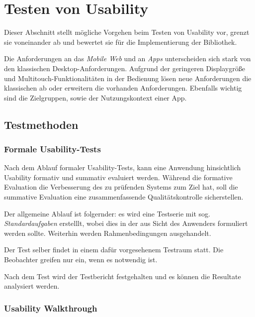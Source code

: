 \section{Testen von Usability}
\label{usability_testing}

Dieser Abschnitt stellt mögliche Vorgehen beim Testen von Usability vor, grenzt sie voneinander ab und bewertet sie für die Implementierung der Bibliothek. 

Die Anforderungen an das \textit{Mobile Web} und an \textit{Apps} unterscheiden sich stark von den klassischen Desktop-Anforderungen. Aufgrund der geringeren Displaygröße und Multitouch-Funktionalitäten in der Bedienung lösen neue Anforderungen die klassischen ab oder erweitern die vorhanden Anforderungen. Ebenfalls wichtig sind die Zielgruppen, sowie der Nutzungskontext einer App. 

\subsection{Testmethoden \label{sec:testmethoden}}

\subsubsection{Formale Usability-Tests \label{sec:formal-usability-test}}

Nach dem Ablauf formaler Usability-Tests, kann eine Anwendung hinsichtlich Usability formativ und summativ evaluiert werden. Während die formative Evaluation die Verbesserung des zu prüfenden Systems zum Ziel hat, soll die summative Evaluation eine zusammenfassende Qualitätskontrolle sicherstellen. 

Der allgemeine Ablauf ist folgernder: es wird eine Testserie mit sog. \textit{Standardaufgaben} erstelllt, wobei dies in der aus Sicht des Anwenders formuliert werden sollte. Weiterhin werden Rahmenbedingungen ausgehandelt. 

Der Test selber findet in einem dafür vorgesehenem Testraum statt. Die Beobachter greifen nur ein, wenn es notwendig ist. 

Nach dem Test wird der Testbericht festgehalten und es können die Resultate analysiert werden. 

\subsubsection{Usability Walkthrough}

